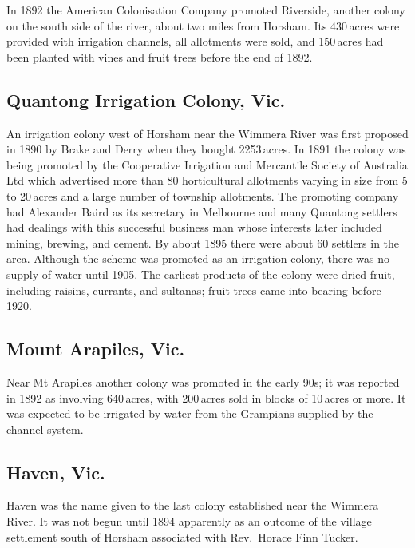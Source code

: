 In 1892 the American Colonisation Company promoted Riverside, another
colony on the south side of the river, about two miles from Horsham.
Its 430\,acres were provided with irrigation channels, all allotments
were sold, and 150\,acres had been planted with vines and fruit trees
before the end of 1892.

\subsection*{Quantong Irrigation Colony, Vic.}

An irrigation colony west of Horsham near the Wimmera River was first
proposed in 1890 by Brake and Derry when they bought 2253\,acres.  In
1891 the colony was being promoted by the Cooperative Irrigation and
Mercantile Society of Australia Ltd  which advertised more than 80
horticultural allotments varying in size from 5 to 20\,acres and a
large number of township allotments.  The promoting company had
Alexander Baird  as its secretary in Melbourne and
many Quantong settlers had dealings with this successful business man
whose interests later included mining, brewing, and cement.  By about
1895 there were about 60 settlers in the area.  Although the scheme
was promoted as an irrigation colony, there was no supply of water
until 1905.  The earliest products of the colony were dried fruit,
including raisins, currants, and sultanas; fruit trees came into
bearing before 1920.

\subsection*{Mount Arapiles, Vic.}

Near Mt Arapiles another colony was promoted in the early 90s; it was
reported in 1892 as involving 640\,acres, with 200\,acres sold in blocks of
10\,acres or more.  It was expected to be irrigated by water from the
Grampians supplied by the channel system.

\subsection*{Haven, Vic.}

Haven was the name given to the last colony established near the
Wimmera River.  It was not begun until 1894 apparently as an outcome
of the village settlement south of Horsham associated with Rev.~Horace
Finn Tucker.

